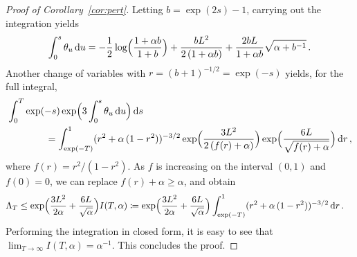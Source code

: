 \documentclass[10pt,a4paper]{amsart}
\newcommand*{\dd}{\, \rd}
\newcommand*{\defeq}{\coloneqq}
\newcommand*{\rd}{\mathrm{d}}
\begin{document}
\begin{proof}[Proof of Corollary~\ref{cor:pert}]
Letting $b = \exp(2{s}) - 1$, carrying out the integration yields
\begin{align*}
    \int_0^{s}\theta_u \dd u = -\frac{1}{2}\log\Bigl(\frac{1+\alpha b}{1+b}\Bigr) + \frac{b L^2}{2\,(1+\alpha b)} + \frac{2 b L}{1+\alpha b}\sqrt{\alpha + b^{-1}}\,.
\end{align*}
Another change of variables with $r = (b+1)^{-1/2} = \exp(-{s})$ yields, for the full integral,
\begin{align*}
 &\int_0^{T} \exp(-{s}) \exp\Bigl(3 \int_0^{{s}} \theta_u \dd u\Bigr)\dd s \\
 &\qquad \qquad =\int_{\exp(-T)}^1 (r^{2} + \alpha\,(1-r^{2}))^{-3/2}\exp\Bigl(\frac{3L^2}{2\,(f(r) + \alpha)}\Bigr)\exp\Bigl(\frac{6L}{\sqrt{f(r) + \alpha}}\Bigr) \dd r\,,
\end{align*}
where $f(r) = r^2/(1-r^2)$. As $f$ is increasing on the interval $(0,1)$ and $f(0) = 0$, we can replace $f(r)  +\alpha \geq \alpha$, and obtain
\begin{align*}
    {\Lambda_T} &\leq \exp\Bigl(\frac{3L^2}{2\alpha} + \frac{6L}{\sqrt{\alpha}}\Bigr) I(T,\alpha) \defeq \exp\Bigl(\frac{3L^2}{2\alpha} + \frac{6L}{\sqrt{\alpha}}\Bigr)  \int_{\exp(-T)}^{1} (r^2 + \alpha\,(1-r^2))^{-3/2} \dd r\,.
\end{align*}
Performing the integration in closed form, it is easy to see that $\lim_{T\to\infty} I(T,\alpha) = \alpha^{-1}$. This concludes the proof.
\end{proof}
\end{document}
